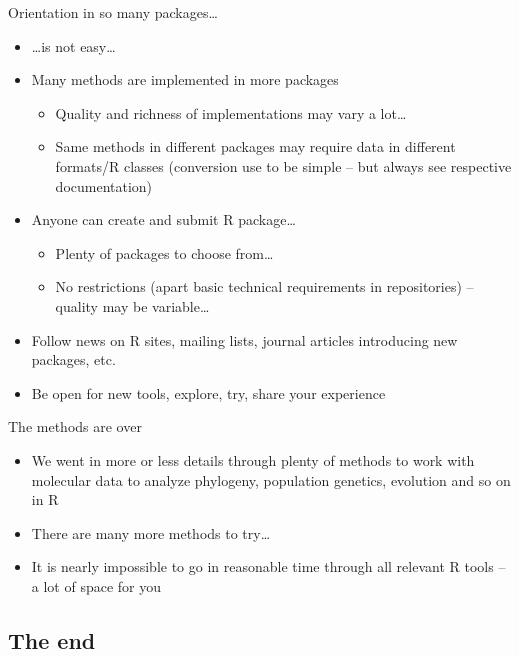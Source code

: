 \documentclass[compress, ucs, xelatex, 11pt, xcolor=svgnames,
  hyperref={
    bookmarks=true,
    unicode=true,
    colorlinks=true,
    pdftitle={Molecular data in R},
    plainpages=false,
    pdfauthor={Vojtech Zeisek},
    pdfsubject={Course about phylogeny and evolution in R},
    pdfcreator={XeLaTeX},
    pdfkeywords={R, evolution, phylogeny, molecular data},
    linkcolor=Tomato,
    anchorcolor=SaddleBrown,
    citecolor=Goldenrod,
    filecolor=DarkMagenta,
    menucolor=Sienna,
    urlcolor=DarkTurquoise,
    pdftex},
  url={hyphens, lowtilde} %
  ]{beamer}
\begin{document}
\begin{frame}{Orientation in so many packages\ldots}
  \begin{itemize}
    \item \ldots is not easy\ldots
    \item Many methods are implemented in more packages
    \begin{itemize}
      \item Quality and richness of implementations may vary a lot\ldots
      \item Same methods in different packages may require data in different formats/R classes (conversion use to be simple -- but always see respective documentation)
    \end{itemize}
    \item Anyone can create and submit R package\ldots
    \begin{itemize}
      \item Plenty of packages to choose from\ldots
      \item No restrictions (apart basic technical requirements in repositories) -- quality may be variable\ldots
    \end{itemize}
    \item Follow news on R sites, mailing lists, journal articles introducing new packages, etc.
    \item Be open for new tools, explore, try, share your experience
  \end{itemize}
\end{frame}

\begin{frame}{The methods are over}
  \begin{itemize}
    \item We went in more or less details through plenty of methods to work with molecular data to analyze phylogeny, population genetics, evolution and so on in R
    \item There are many more methods to try\ldots
    \item It is nearly impossible to go in reasonable time through all relevant R tools -- a lot of space for you
  \end{itemize}
\end{frame}

\subsection{The end}
\end{document}
